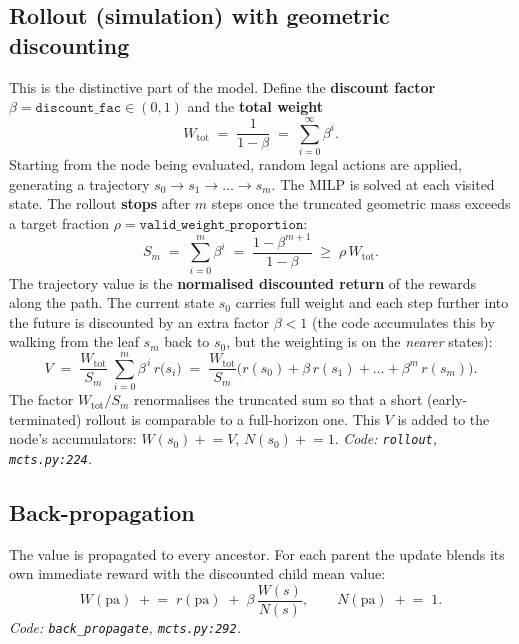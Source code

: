 \documentclass[11pt]{article}
\newcommand{\pa}{\mathrm{pa}}
\begin{document}
\subsection{Rollout (simulation) with geometric discounting}
\label{sec:rollout}
This is the distinctive part of the model. Define the \textbf{discount factor}
$\beta = \texttt{discount\_fac}\in(0,1)$ and the \textbf{total weight}
\begin{equation}
  W_{\text{tot}} \;=\; \frac{1}{1-\beta} \;=\; \sum_{i=0}^{\infty}\beta^{i}.
\end{equation}
Starting from the node being evaluated, random legal actions are applied, generating a
trajectory $s_0 \to s_1 \to \dots \to s_m$. The MILP is solved at each visited state.
The rollout \textbf{stops} after $m$ steps once the truncated geometric mass exceeds a
target fraction $\rho = \texttt{valid\_weight\_proportion}$:
\begin{equation}
  S_m \;=\; \sum_{i=0}^{m}\beta^{i} \;=\; \frac{1-\beta^{m+1}}{1-\beta}
  \;\ge\; \rho\, W_{\text{tot}} .
\end{equation}
The trajectory value is the \textbf{normalised discounted return} of the rewards along
the path. The current state $s_0$ carries full weight and each step further into the
future is discounted by an extra factor $\beta<1$ (the code accumulates this by walking
from the leaf $s_m$ back to $s_0$, but the weighting is on the \emph{nearer} states):
\begin{equation}
  V \;=\; \frac{W_{\text{tot}}}{S_m}\;\sum_{i=0}^{m}\beta^{\,i}\, r\big(s_{i}\big)
  \;=\; \frac{W_{\text{tot}}}{S_m}\Big(r(s_0) + \beta\,r(s_1) + \dots + \beta^{m}\,r(s_m)\Big).
\end{equation}
The factor $W_{\text{tot}}/S_m$ renormalises the truncated sum so that a short
(early-terminated) rollout is comparable to a full-horizon one. This $V$ is added to the
node's accumulators: $W(s_0)\mathrel{+}= V$, $N(s_0)\mathrel{+}= 1$.
\textit{Code: \texttt{rollout}, \texttt{mcts.py:224}.}

\subsection{Back-propagation}
The value is propagated to every ancestor. For each parent the update blends its own
immediate reward with the discounted child mean value:
\begin{equation}
  W(\pa) \;\mathrel{+}=\; r(\pa) \;+\; \beta\,\frac{W(s)}{N(s)},
  \qquad N(\pa) \;\mathrel{+}=\; 1 .
\end{equation}
\textit{Code: \texttt{back\_propagate}, \texttt{mcts.py:292}.}
\end{document}
